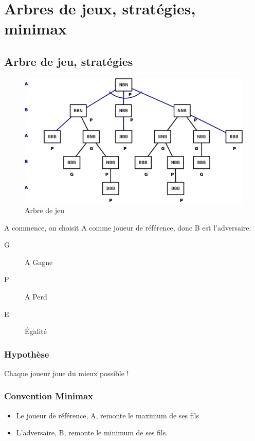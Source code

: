 \documentclass[12pt,a4paper,openany]{book}
\begin{document}
	\chapter{Arbres de jeux, stratégies, minimax}
	\section{Arbre de jeu, stratégies}
	\begin{figure}[H]
		\centering
		\includegraphics[width=16cm]{Diagramme8.eps}
		\caption{Arbre de jeu}
		\label{fig:diag8}
	\end{figure}

	A commence, on choisit A comme joueur de référence, donc
	B est l'adversaire.

	\begin{description}
		\item[G] A Gagne
		\item[P] A Perd
		\item[E] Égalité
	\end{description}

	\subsection{Hypothèse} Chaque joueur joue du mieux possible !
	\subsection{Convention Minimax}
	\begin{itemize}
		\item Le joueur de référence, A, remonte le maximum de ses fils
		\item L'adversaire, B, remonte le minimum de ses
			fils.
	\end{itemize}
\end{document}
